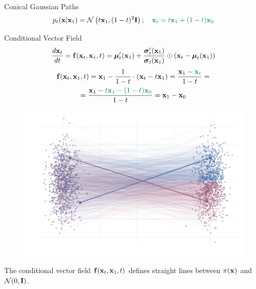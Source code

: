 \documentclass{beamer}
\begin{document}
\begin{frame}{Conical Gaussian Paths}
	\[
		p_t(\mathbf{x} | \mathbf{x}_1) = \mathcal{N}\left(t \mathbf{x}_1, (1-t)^2 \mathbf{I}\right); \quad {\color{teal}\mathbf{x}_t = t \mathbf{x}_1 + (1 - t) \mathbf{x}_0}
	\]
	\vspace{-0.3cm}
	\begin{block}{Conditional Vector Field}
		\vspace{-0.3cm}
		\[
			 \frac{d\mathbf{x}_t}{dt} = \mathbf{f}(\mathbf{x}_t, \mathbf{x}_1, t) =  \boldsymbol{\mu}_t'(\mathbf{x}_1) + \frac{\boldsymbol{\sigma}_t'(\mathbf{x}_1)}{\boldsymbol{\sigma}_t(\mathbf{x}_1)} \odot (\mathbf{x}_t - \boldsymbol{\mu}_t(\mathbf{x}_1))
		\]
		\vspace{-0.5cm}
		\begin{multline*}
			\mathbf{f}(\mathbf{x}_t, \mathbf{x}_1, t) = \mathbf{x}_1 - \frac{1}{1-t} \cdot (\mathbf{x}_t - t \mathbf{x}_1) = \frac{\mathbf{x}_1 - {\color{teal}\mathbf{x}_t}}{1-t} = \\
			= \frac{\mathbf{x}_1 - {\color{teal}t \mathbf{x}_1 - (1 - t) \mathbf{x}_0}}{1-t} = \mathbf{x}_1 - \mathbf{x}_0
		\end{multline*}
		\vspace{-0.7cm}
	\end{block}
	\begin{minipage}[t]{0.55\columnwidth}
		\vspace{-0.7cm}
		\begin{figure}
			\centering
			\includegraphics[width=0.9\linewidth]{figs/g2g-vector-field-samples-cond}
		\end{figure}
	\end{minipage}%
	\begin{minipage}[t]{0.45\columnwidth}
		The conditional vector field $\mathbf{f}(\mathbf{x}_t, \mathbf{x}_1, t)$ defines straight lines between $\pi(\mathbf{x})$ and $\mathcal{N}(0, \mathbf{I})$.
	\end{minipage}
\end{frame}
\end{document}
